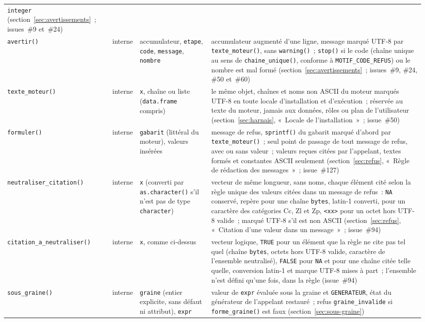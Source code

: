 \documentclass[a4paper,11pt]{article}
\newcommand{\code}[1]{\texttt{\small #1}}
\newcommand{\catalogue}[2]{\code{#2}}
\begin{document}
{\begin{longtable}{@{}p{6.2cm}p{1.4cm}p{2.6cm}p{4.4cm}@{}}
\code{integer} (section~\ref{sec:avertissements}~; issues~\#9 et~\#24) \\
\catalogue{fonctions-outils}{avertir()} & interne & accumulateur, \code{etape},
\code{code}, \code{message}, \code{nombre} & accumulateur augmenté d'une ligne,
message marqué UTF-8 par \code{texte\_moteur()}, sans \code{warning()}~;
\code{stop()} si le code (chaîne unique au sens de \code{chaine\_unique()},
conforme à \code{MOTIF\_CODE\_REFUS}) ou le nombre est mal formé
(section~\ref{sec:avertissements}~; issues~\#9, \#24, \#50 et~\#60) \\
\catalogue{fonctions-outils}{texte\_moteur()} & interne & \code{x}, chaîne ou
liste (\code{data.frame} compris) & le même objet, chaînes et noms non ASCII
du moteur marqués UTF-8 en toute locale d'installation et d'exécution~;
réservée au texte du moteur, jamais aux données, rôles ou plan de
l'utilisateur (section~\ref{sec:harnais}, «~Locale de
l'installation~»~; issue~\#50) \\
\catalogue{fonctions-outils}{formuler()} & interne & \code{gabarit}
(littéral du moteur), valeurs insérées & message de refus,
\code{sprintf()} du gabarit marqué d'abord par \code{texte\_moteur()}~;
seul point de passage de tout message de refus, avec ou sans valeur~;
valeurs reçues citées par l'appelant, textes formés et constantes ASCII
seulement (section~\ref{sec:refus}, «~Règle de rédaction des
messages~»~; issue~\#127) \\
\catalogue{fonctions-outils}{neutraliser\_citation()} & interne & \code{x}
(converti par \code{as.character()} s'il n'est pas de type
\code{character}) & vecteur de même longueur, sans noms, chaque élément
cité selon la règle unique des valeurs citées dans un message de refus~:
\code{NA} conservé, repère pour une chaîne \code{bytes}, latin-1 converti,
\code{<U+XXXX>} pour un caractère des catégories Cc, Zl et Zp,
\code{<xx>} pour un octet hors UTF-8 valide~; marqué UTF-8 s'il est non
ASCII (section~\ref{sec:refus}, «~Citation d'une valeur dans un
message~»~; issue~\#94) \\
\catalogue{fonctions-outils}{citation\_a\_neutraliser()} & interne &
\code{x}, comme ci-dessus & vecteur logique, \code{TRUE} pour un élément
que la règle ne cite pas tel quel (chaîne \code{bytes}, octets hors UTF-8
valide, caractère de l'ensemble neutralisé), \code{FALSE} pour \code{NA}
et pour une chaîne citée telle quelle, conversion latin-1 et marque UTF-8
mises à part~; l'ensemble n'est défini qu'une fois, dans la règle
(issue~\#94) \\
\catalogue{fonctions-outils}{sous\_graine()} & interne & \code{graine} (entier
explicite, sans défaut ni attribut), \code{expr} & valeur de \code{expr} évaluée sous la
graine et \code{GENERATEUR}, état du générateur de l'appelant restauré~; refus
\code{graine\_invalide} si \code{forme\_graine()} est faux
(section~\ref{sec:sous-graine}) \\
\end{longtable}
}
\end{document}
